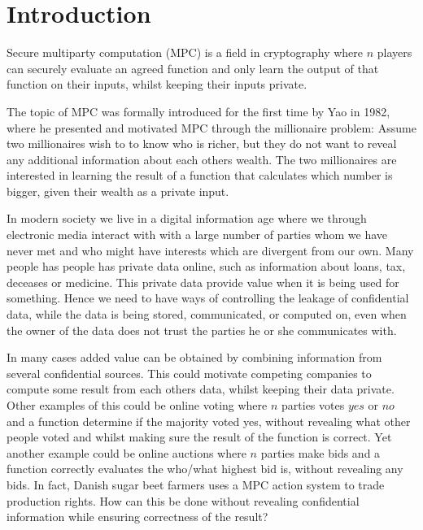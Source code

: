 \chapter{Introduction}
\label{cha:introduction}

Secure multiparty computation (MPC) is a field in cryptography where $n$ players can securely evaluate an agreed function and only learn the output of that function on their inputs, whilst keeping their inputs private. 

The topic of MPC was formally introduced for the first time by Yao\cite{Yao:1982} in 1982, where he presented and motivated MPC through the millionaire problem: Assume two millionaires wish to to know who is richer, but they do not want to reveal any additional information about each others wealth. The two millionaires are interested in learning the result of a function that calculates which number is bigger, given their wealth as a private input. 

In modern society we live in a digital information age where we through electronic media interact with with a large number of parties whom we have never met and who might have interests which are divergent from our own. Many people has people has private data online, such as information about loans, tax, deceases or medicine. This private data provide value when it is being used for something. Hence we need to have ways of controlling the leakage of confidential data, while the data is being stored, communicated, or computed on, even when the owner of the data does not trust the parties he or she communicates with.

In many cases added value can be obtained by combining information from several confidential sources. This could motivate competing companies to compute some result from each others data, whilst keeping their data private. Other examples of this could be online voting where $n$ parties votes $yes$ or $no$ and a function determine if the majority voted yes, without revealing what other people voted and whilst making sure the result of the function is correct. Yet another example could be online auctions where $n$ parties make bids and a function correctly evaluates the who/what highest bid is, without revealing any bids. In fact, Danish sugar beet farmers uses a MPC action system to trade production rights. How can this be done without revealing confidential information while ensuring correctness of the result?


